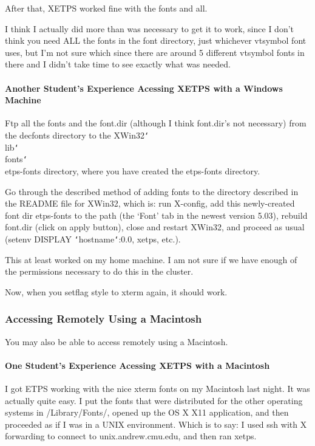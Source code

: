 \documentclass{article}
\begin{document}
After that, XETPS worked fine with the fonts and all.

I think I actually did more than was necessary to get it to work,
since I don't think you need ALL the fonts in the {\ETPS} font directory,
just whichever vtsymbol font {\ETPS} uses, but I'm not sure which since
there are around 5 different vtsymbol fonts in there and I didn't take
time to see exactly what was needed.

\paragraph{Another Student's Experience Acessing XETPS with a Windows Machine}

Ftp all the fonts and the font.dir (although I think font.dir's not
necessary)  from the decfonts directory to the \linebreak
XWin32{\tt\char`\\}lib{\tt\char`\\}fonts{\tt\char`\\}etps-fonts
directory, where you have created the etps-fonts directory.

Go through the described method of adding fonts to the directory
described in the README file for XWin32, which
is:  run X-config, add this newly-created font dir etps-fonts to the path
(the `Font' tab in the newest version 5.03), rebuild font.dir (click on
apply button), close and restart XWin32, and proceed as usual (setenv
DISPLAY {\tt\char`\<}hostname{\tt\char`\>}:0.0, xetps, etc.).

This at least worked on my home machine.  I am not sure if we have
enough of the permissions necessary to do this in the cluster.

Now, when you setflag style to xterm again, it should work.

\subsubsection{Accessing {\ETPS} Remotely Using a Macintosh}

You may also be able to access {\ETPS} remotely using a Macintosh.

\paragraph{One Student's Experience Acessing XETPS with a Macintosh}

I got ETPS working with the nice xterm fonts on my Macintosh last
night. It was actually quite easy. I put the fonts that were
distributed for the other operating systems in /Library/Fonts/, opened
up the OS X X11 application, and then proceeded as if I was in a UNIX
environment. Which is to say: I used ssh with X forwarding to connect
to unix.andrew.cmu.edu, and then ran xetps.
\end{document}
